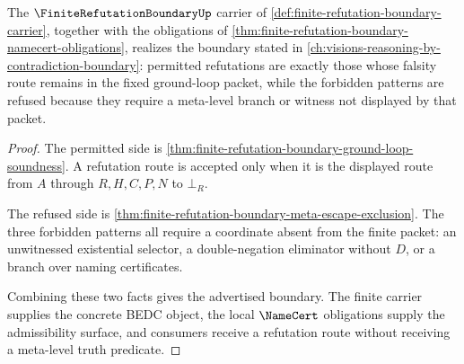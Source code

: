 \begin{theorem}
\label{thm:finite-refutation-boundary-vision-concretization}
The $\FiniteRefutationBoundaryUp$ carrier of \autoref{def:finite-refutation-boundary-carrier}, together with the obligations of \autoref{thm:finite-refutation-boundary-namecert-obligations}, realizes the boundary stated in \autoref{ch:visions-reasoning-by-contradiction-boundary}: permitted refutations are exactly those whose falsity route remains in the fixed ground-loop packet, while the forbidden patterns are refused because they require a meta-level branch or witness not displayed by that packet.
\end{theorem}
\begin{proof}
The permitted side is \autoref{thm:finite-refutation-boundary-ground-loop-soundness}. A refutation route is accepted only when it is the displayed route from $A$ through $R,H,C,P,N$ to $\bot_R$.

The refused side is \autoref{thm:finite-refutation-boundary-meta-escape-exclusion}. The three forbidden patterns all require a coordinate absent from the finite packet: an unwitnessed existential selector, a double-negation eliminator without $D$, or a branch over naming certificates.

Combining these two facts gives the advertised boundary. The finite carrier supplies the concrete BEDC object, the local $\NameCert$ obligations supply the admissibility surface, and consumers receive a refutation route without receiving a meta-level truth predicate.
\end{proof}


